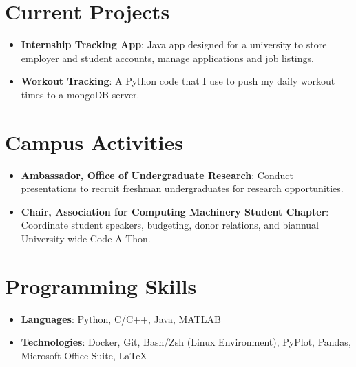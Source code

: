 \documentclass[letterpaper,11pt]{article}
\newcommand{\resumeItem}[2]{
  \item\small{
    \textbf{#1}{: #2 \vspace{-2pt}}
  }
}
\newcommand{\resumeSubItem}[2]{\resumeItem{#1}{#2}\vspace{-4pt}}
\newcommand{\resumeSubHeadingListStart}{\begin{itemize}[leftmargin=*]}
\newcommand{\resumeSubHeadingListEnd}{\end{itemize}}
\begin{document}
\section{Current Projects}
  \resumeSubHeadingListStart
    \resumeSubItem{Internship Tracking App}
      {Java app designed for a university to store employer and student accounts, manage applications and job listings.}
    \resumeSubItem{Workout Tracking}
      {A Python code that I use to push my daily workout times to a mongoDB server.}
  \resumeSubHeadingListEnd


\section{Campus Activities}
  \resumeSubHeadingListStart
    \resumeSubItem{Ambassador, Office of Undergraduate Research}
      {Conduct presentations to recruit freshman undergraduates for research opportunities.}
    \resumeSubItem{Chair, Association for Computing Machinery Student Chapter}
      {Coordinate student speakers, budgeting, donor relations, and biannual University-wide Code-A-Thon.}
  \resumeSubHeadingListEnd

%
\section{Programming Skills}
  \resumeSubHeadingListStart
    \resumeSubItem{Languages}{Python, C/C++, Java, MATLAB}
    \resumeSubItem{Technologies}{Docker, Git, Bash/Zsh (Linux Environment), PyPlot, Pandas, Microsoft Office Suite, \LaTeX}
  \resumeSubHeadingListEnd


\end{document}
